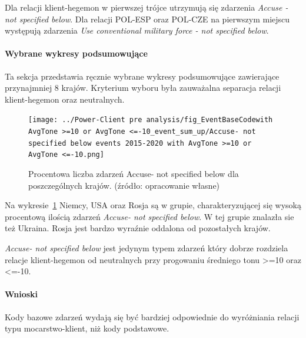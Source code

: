 \documentclass[11pt]{report}
\begin{document}
    Dla relacji klient-hegemon w pierwszej trójce utrzymują się zdarzenia \textit{Accuse - not specified below}.
    Dla relacji POL-ESP oraz POL-CZE na pierwszym miejscu występują zdarzenia \textit{Use conventional military force - not specified below}.

    \paragraph{Wybrane wykresy podsumowujące}
    Ta sekcja przedstawia ręcznie wybrane wykresy podsumowujące zawierające przynajmniej 8 krajów.
    Kryterium wyboru była zauważalna separacja relacji klient-hegemon oraz neutralnych.

    \begin{figure}[!htp]
        \centering
        \texttt{[image: ../Power-Client pre analysis/fig\_EventBaseCodewith AvgTone >=10 or AvgTone <=-10\_event\_sum\_up/Accuse- not specified below events 2015-2020 with AvgTone >=10 or AvgTone <=-10.png]}
        \caption{Procentowa liczba zdarzeń Accuse- not specified below dla poszczególnych krajów. (źródło: opracowanie własne)}
        \label{fig:Power-Client:ERC:Mentions:SumUp:Accuse- not specified below}
    \end{figure}
    Na wykresie~\ref{fig:Power-Client:ERC:Mentions:SumUp:Accuse- not specified below} Niemcy, USA oraz Rosja są w grupie,
    charakteryzującej się wysoką procentową ilością zdarzeń \textit{Accuse- not specified below}.
    W tej grupie znalazła sie też Ukraina.
    Rosja jest bardzo wyraźnie oddalona od pozostałych krajów.

    \textit{Accuse- not specified below} jest jedynym typem zdarzeń który dobrze rozdziela relacje klient-hegemon od neutralnych
    przy progowaniu średniego tonu >=10 oraz <=-10.

    \paragraph{Wnioski}
    Kody bazowe zdarzeń wydają się być bardziej odpowiednie do wyróżniania relacji typu mocarstwo-klient, niż kody podstawowe.
\end{document}
